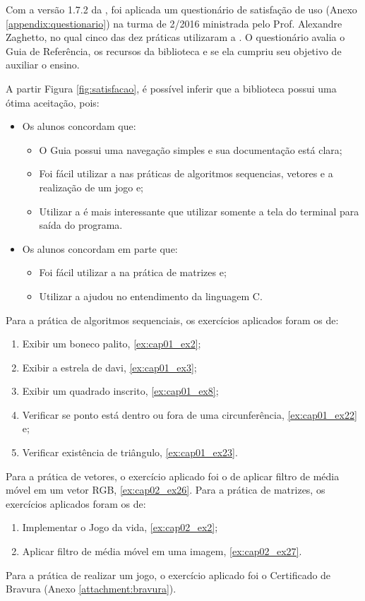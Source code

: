 Com a versão 1.7.2 da \playAPC{}, foi aplicada um questionário de satisfação de uso (Anexo \ref{appendix:questionario}) na turma de 2/2016 ministrada pelo Prof. Alexandre Zaghetto, no qual cinco das dez práticas utilizaram a \playAPC{}. O questionário avalia o Guia de Referência, os recursos da biblioteca e se ela cumpriu seu objetivo de auxiliar o ensino. 

%
A partir Figura \ref{fig:satisfacao}, é possível inferir que a biblioteca possui uma ótima aceitação, pois: 
\begin{itemize}
  \item Os alunos concordam que:
    \begin{itemize}
       \item O Guia possui uma navegação simples e sua documentação está clara;
       \item Foi fácil utilizar a \playAPC{} nas práticas de algoritmos sequencias, vetores e a realização de um jogo e;
       \item Utilizar a \playAPC{} é mais interessante que utilizar somente a tela do terminal para saída do programa.
    \end{itemize}
  \item Os alunos concordam em parte que:
    \begin{itemize}
      \item Foi fácil utilizar a \playAPC{} na prática de matrizes e;
      \item Utilizar a \playAPC{} ajudou no entendimento da linguagem C.
    \end{itemize}
\end{itemize}
 
 Para a prática de algoritmos sequenciais, os exercícios aplicados foram os de:
   \begin{enumerate}
     \item Exibir um boneco palito, \ref{ex:cap01_ex2};
     \item Exibir a estrela de davi, \ref{ex:cap01_ex3};
     \item Exibir um quadrado inscrito, \ref{ex:cap01_ex8};
     \item Verificar se ponto está dentro ou fora de uma circunferência, \ref{ex:cap01_ex22} e;
     \item Verificar existência de triângulo, \ref{ex:cap01_ex23}.
  \end{enumerate}
  Para a prática de vetores, o exercício aplicado foi o de aplicar filtro de média móvel em um vetor RGB, \ref{ex:cap02_ex26}.
  Para a prática de matrizes, os exercícios aplicados foram os de:
  \begin{enumerate}
     \item Implementar o Jogo da vida, \ref{ex:cap02_ex2};
     \item Aplicar filtro de média móvel em uma imagem, \ref{ex:cap02_ex27}.
  \end{enumerate}
  Para a prática de realizar um jogo, o exercício aplicado foi o Certificado de Bravura (Anexo \ref{attachment:bravura}).

